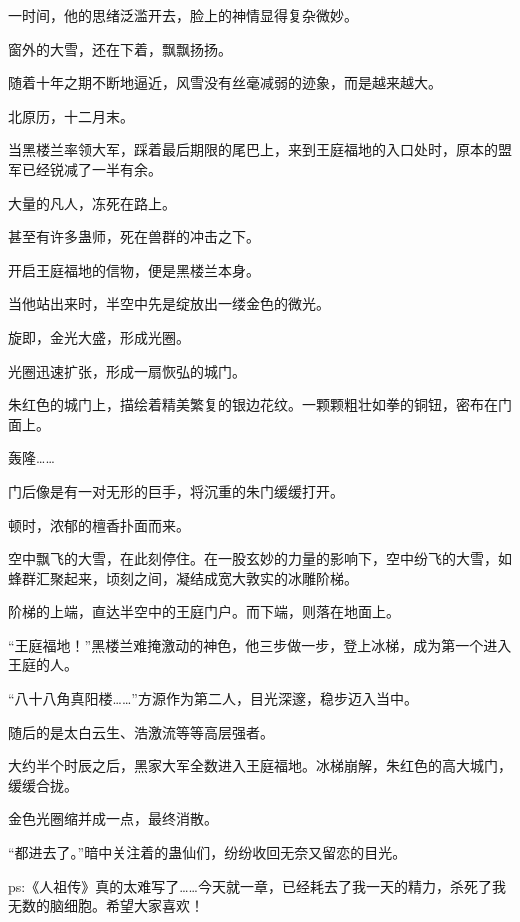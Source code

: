\begin{this_body}
一时间，他的思绪泛滥开去，脸上的神情显得复杂微妙。

窗外的大雪，还在下着，飘飘扬扬。

随着十年之期不断地逼近，风雪没有丝毫减弱的迹象，而是越来越大。

北原历，十二月末。

当黑楼兰率领大军，踩着最后期限的尾巴上，来到王庭福地的入口处时，原本的盟军已经锐减了一半有余。

大量的凡人，冻死在路上。

甚至有许多蛊师，死在兽群的冲击之下。

开启王庭福地的信物，便是黑楼兰本身。

当他站出来时，半空中先是绽放出一缕金色的微光。

旋即，金光大盛，形成光圈。

光圈迅速扩张，形成一扇恢弘的城门。

朱红色的城门上，描绘着精美繁复的银边花纹。一颗颗粗壮如拳的铜钮，密布在门面上。

轰隆……

门后像是有一对无形的巨手，将沉重的朱门缓缓打开。

顿时，浓郁的檀香扑面而来。

空中飘飞的大雪，在此刻停住。在一股玄妙的力量的影响下，空中纷飞的大雪，如蜂群汇聚起来，顷刻之间，凝结成宽大敦实的冰雕阶梯。

阶梯的上端，直达半空中的王庭门户。而下端，则落在地面上。

“王庭福地！”黑楼兰难掩激动的神色，他三步做一步，登上冰梯，成为第一个进入王庭的人。

“八十八角真阳楼……”方源作为第二人，目光深邃，稳步迈入当中。

随后的是太白云生、浩激流等等高层强者。

大约半个时辰之后，黑家大军全数进入王庭福地。冰梯崩解，朱红色的高大城门，缓缓合拢。

金色光圈缩并成一点，最终消散。

“都进去了。”暗中关注着的蛊仙们，纷纷收回无奈又留恋的目光。

ps:《人祖传》真的太难写了……今天就一章，已经耗去了我一天的精力，杀死了我无数的脑细胞。希望大家喜欢！

\end{this_body}

